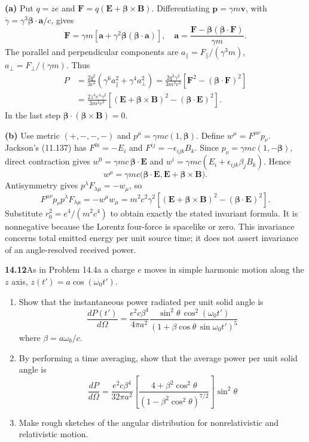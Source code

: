 \textbf{(a)} Put $q=ze$ and
$\mathbf F=q(\mathbf E+\boldsymbol\beta\times\mathbf B)$.
Differentiating $\mathbf p=\gamma m\mathbf v$, with
$\dot\gamma=\gamma^3\boldsymbol\beta\cdot\mathbf a/c$, gives
\[
\mathbf F=\gamma m[\mathbf a+
\gamma^2\boldsymbol\beta(\boldsymbol\beta\cdot\mathbf a)],
\quad
\mathbf a=\frac{\mathbf F-\boldsymbol\beta(\boldsymbol\beta\cdot\mathbf F)}
{\gamma m}.
\]
The parallel and perpendicular components are
$a_\parallel=F_\parallel/(\gamma^3m)$,
$a_\perp=F_\perp/(\gamma m)$. Thus
\begin{align*}
P&=\frac{2q^2}{3c^3}(\gamma^6a_\parallel^2+\gamma^4a_\perp^2)
=\frac{2q^2\gamma^2}{3m^2c^3}
[\mathbf F^2-(\boldsymbol\beta\cdot\mathbf F)^2]\\
&=\boxed{\frac{2z^4e^4\gamma^2}{3m^2c^3}
[(\mathbf E+\boldsymbol\beta\times\mathbf B)^2
-(\boldsymbol\beta\cdot\mathbf E)^2].}
\end{align*}
In the last step $\boldsymbol\beta\cdot(\boldsymbol\beta\times\mathbf B)=0$.

\textbf{(b)} Use metric $(+,-,-,-)$ and $p^\mu=\gamma mc(1,\boldsymbol\beta)$.
Define $w^\mu=F^{\mu\nu}p_\nu$. Jackson's (11.137) has $F^{0i}=-E_i$ and
$F^{ij}=-\epsilon_{ijk}B_k$. Since
$p_\nu=\gamma mc(1,-\boldsymbol\beta)$, direct contraction gives
$w^0=\gamma mc\,\boldsymbol\beta\cdot\mathbf E$ and
$w^i=\gamma mc(E_i+\epsilon_{ijk}\beta_jB_k)$. Hence
\[
w^\mu=\gamma mc\bigl(\boldsymbol\beta\cdot\mathbf E,
\mathbf E+\boldsymbol\beta\times\mathbf B\bigr).
\]
Antisymmetry gives $p^\lambda F_{\lambda\mu}=-w_\mu$, so
\[
F^{\mu\nu}p_\nu p^\lambda F_{\lambda\mu}
=-w^\mu w_\mu=m^2c^2\gamma^2
[(\mathbf E+\boldsymbol\beta\times\mathbf B)^2
-(\boldsymbol\beta\cdot\mathbf E)^2].
\]
Substitute $r_0^2=e^4/(m^2c^4)$ to obtain exactly the stated invariant
formula. It is nonnegative because the Lorentz four-force is spacelike
or zero. This invariance concerns total emitted energy per unit source
time; it does not assert invariance of an angle-resolved received power.

\par\bigskip
\noindent\textbf{14.12}\quad As in Problem 14.4a a charge $e$ moves in simple harmonic motion along the $z$ axis, $z(t')=a\cos(\omega_{0}t')$.
\begin{enumerate}
\item[(a)] Show that the instantaneous power radiated per unit solid angle is
\[
\frac{dP(t')}{d\Omega}=\frac{e^{2}c\beta^{4}}{4\pi a^{2}}\frac{\sin^{2}\theta\,\cos^{2}(\omega_{0}t')}{(1+\beta\cos\theta\,\sin\omega_{0}t')^{5}}
\]
where $\beta=a\omega_{0}/c$.
\item[(b)] By performing a time averaging, show that the average power per unit solid angle is
\[
\frac{dP}{d\Omega}=\frac{e^{2}c\beta^{4}}{32\pi a^{2}}\left[\frac{4+\beta^{2}\cos^{2}\theta}{(1-\beta^{2}\cos^{2}\theta)^{7/2}}\right]\sin^{2}\theta
\]
\item[(c)] Make rough sketches of the angular distribution for nonrelativistic and relativistic motion.
\end{enumerate}
\solution

